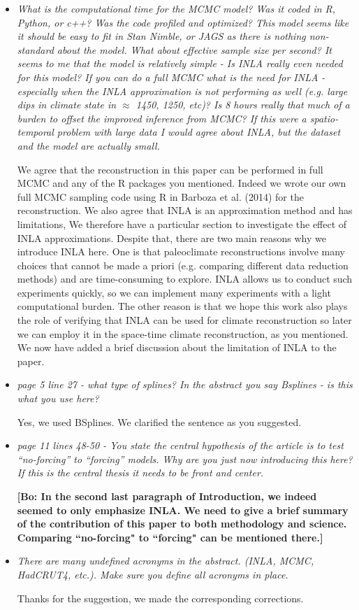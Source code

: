 \documentclass[11pt]{article}
\newcommand{\bl}[1]{\color{red}\textbf{[Bo: #1]}\normalcolor}
\begin{document}
\begin{itemize}
\item \textit{What is the computational time for the MCMC model? Was it coded in
    R, Python, or c++? Was the code profiled and optimized? This model seems
    like it should be easy to fit in Stan Nimble, or JAGS as there is nothing non-standard about the model. What about effective sample size per second? It seems
to me that the model is relatively simple - Is INLA really even needed for this
model? If you can do a full MCMC what is the need for INLA - especially when the
INLA approximation is not performing as well (e.g. large dips in climate state
in $\approx$ 1450, 1250, etc)? Is 8 hours really that much of a burden to offset
the improved
inference from MCMC? If this were a spatio-temporal problem with large data I
would agree about INLA, but the dataset and the model are actually small.
}

We agree that the reconstruction in this paper can be performed in full MCMC and any of the R packages you mentioned. Indeed we wrote our own full MCMC sampling code using R in Barboza et al. (2014) for the reconstruction. We also agree that INLA is an approximation method and has limitations, We therefore have a particular section to investigate the effect of INLA approximations. Despite that,  there are two main reasons why we introduce INLA here. One is that paleoclimate reconstructions involve many choices that cannot be made a priori (e.g. comparing different data reduction methods) and are time-consuming to explore. INLA allows us to conduct such experiments quickly, so we can implement many experiments with a light computational burden. The other reason is that we hope this work also plays the role of verifying that INLA can be used for climate reconstruction so later we can employ it in the space-time climate reconstruction, as you mentioned. We now have added a brief discussion about the limitation of INLA to the paper.


\item \textit{page 5 line 27 - what type of splines? In the abstract you say Bsplines - is this what you use here?}

Yes, we used BSplines. We clarified the sentence as you suggested.

\item \textit{page 11 lines 48-50 - You state the central hypothesis of the
    article is to test “no-forcing” to “forcing” models. Why are you just now
    introducing this here? If this is the central thesis it needs to be front
    and center.}

 \bl{In the second last paragraph of Introduction, we indeed seemed to only emphasize INLA. We need to give a brief summary of the contribution of this paper to both methodology and science. Comparing ``no-forcing" to ``forcing" can be mentioned there.}

\item \textit{There are many undefined acronyms in the abstract. (INLA, MCMC,
    HadCRUT4, etc.). Make sure you define all acronyms in place.}

Thanks for the suggestion, we made the corresponding corrections.


\end{itemize}
\end{document}
